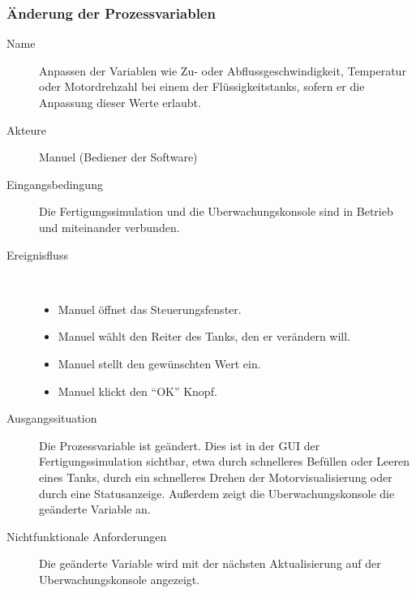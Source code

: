 \documentclass[parskip=full]{scrartcl}
\begin{document}
\subsubsection{Änderung der Prozessvariablen}
\begin{description}
  \item[Name] Anpassen der Variablen wie Zu- oder Abflussgeschwindigkeit, Temperatur oder Motordrehzahl bei einem der
  Flüssigkeitstanks, sofern er die Anpassung dieser Werte erlaubt.
  \item[Akteure] Manuel (Bediener der Software)
  \item[Eingangsbedingung] Die \gls{Fertigungssimulation} und die \gls{Uberwachungskonsole} sind in Betrieb und miteinander verbunden.
  \item[Ereignisfluss]~\\
\begin{itemize}[noitemsep]
  \item Manuel öffnet das Steuerungsfenster.
  \item Manuel wählt den Reiter des Tanks, den er verändern will.
  \item Manuel stellt den gewünschten Wert ein.
  \item Manuel klickt den "`OK"' Knopf.
\end{itemize}
  \item[Ausgangssituation] Die \gls{Prozessvariable} ist geändert. Dies ist in der \gls{GUI} der \gls{Fertigungssimulation} sichtbar, etwa durch schnelleres Befüllen oder Leeren eines Tanks,
  durch ein schnelleres Drehen der Motorvisualisierung oder durch eine Statusanzeige.
    Außerdem zeigt die \gls{Uberwachungskonsole} die geänderte Variable an.
  \item [Nichtfunktionale Anforderungen] Die geänderte Variable wird mit der nächsten Aktualisierung auf der \gls{Uberwachungskonsole} angezeigt.
\end{description}
\end{document}
